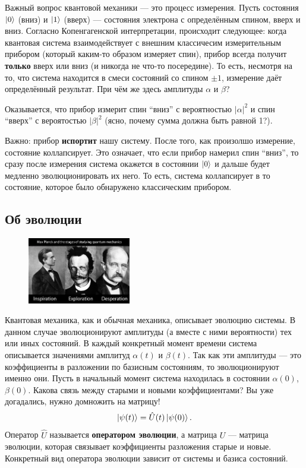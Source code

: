 \documentclass[12pt]{article}
\begin{document}
Важный вопрос квантовой механики --- это процесс измерения. Пусть состояния $\Ket{0}$ (вниз) и $\Ket{1}$ (вверх) --- состояния электрона с определённым спином, вверх и вниз. Согласно Копенгагенской интерпретации, происходит следующее: когда квантовая система взаимодействует с внешним классичесим измерительным прибором (который каким-то образом измеряет спин), прибор всегда получит {\bf только} вверх или вниз (и никогда не что-то посередине). То есть, несмотря на то, что система находится в смеси состояний со спином $\pm 1$, измерение даёт определённый результат. При чём же здесь амплитуды $\alpha$ и $\beta$?

Оказывается, что прибор измерит спин ``вниз'' с вероятностью $|\alpha|^2$ и спин ``вверх'' с вероятостью $|\beta|^2$ (ясно, почему сумма должна быть равной 1?).

Важно: прибор {\bf испортит} нашу систему. После того, как произолшо измерение, состояние коллапсирует. Это означает, что если прибор намерил спин ``вниз'', то сразу после измерения система окажется в состоянии $\Ket{0}$ и дальше будет медленно эволюционировать их него. То есть, система коллапсирует в то состояние, которое было обнаружено классическим прибором.

\subsection*{Об эволюции}
\begin{figure}
  \begin{center}
    \includegraphics[width=0.40\textwidth]{quantumjoke2.png}
  \end{center}
\end{figure}
Квантовая механика, как и обычная механика, описывает эволюцию системы. В данном случае эволюционируют амплитуды (а вместе с ними вероятности) тех или иных состояний. В каждый конкретный момент времени система описывается значениями амплитуд $\alpha(t)$ и $\beta(t)$. Так как эти амплитуды --- это коэффициенты в разложении по базисным состояниям, то эволюционируют именно они. Пусть в начальный момент система находилась в состоянии $\alpha(0)$, $\beta(0)$. Какова связь между старыми и новыми коэффициентами? Вы уже догадались, нужно домножить на матрицу! $$\Ket{\psi(t)} = \hat{U}(t) \Ket{\psi(0)}.$$ Оператор $\hat{U}$ называется {\bf оператором эволюции}, а матрица $U$ --- матрица эволюции, которая связывает коэффициенты разложения старые и новые. Конкретный вид оператора эволюции зависит от системы и базиса состояний.
\end{document}

